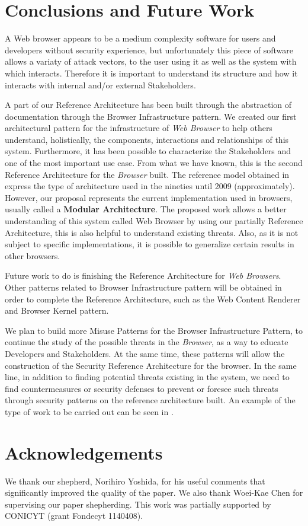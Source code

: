 \documentclass{sig-alternate-05-2015}
\begin{document}
\section{Conclusions and Future Work}
A Web browser appears to be a medium complexity software for users and developers without security experience, but unfortunately this piece of software allows a variaty of attack vectors, to the user using it as well as the system with which interacts. Therefore it is important to understand its structure and how it interacts with internal and/or external Stakeholders.

A part of our Reference Architecture has been built through the abstraction of documentation through the Browser Infrastructure pattern. We created our first architectural pattern for the infrastructure of \textit{Web Browser} to help others understand, holistically, the components, interactions and relationships of this system. Furthermore, it has been possible to characterize the Stakeholders and one of the most important use case. From what we have known, this is the second Reference Architecture for the \textit{Browser} built. The reference model obtained in \cite{2005-grosskurth-browser-refarch} express the type of architecture used in the nineties until 2009 (approximately). However, our proposal represents the current implementation used in browsers, usually called a \textbf{Modular Architecture}. The proposed work allows a better understanding of this system called Web Browser by using our partially Reference Architecture, this is also helpful to understand existing threats. Also, as it is not subject to specific implementations, it is possible to generalize certain results in other browsers. 

Future work to do is finishing the Reference Architecture for \textit{Web Browsers}. Other patterns related to Browser Infrastructure pattern will be obtained in order to complete the Reference Architecture, such as the Web Content Renderer and Browser Kernel pattern. 

We plan to build more Misuse Patterns for the Browser Infrastructure Pattern, to continue the study of the possible threats in the \textit{Browser}, as a way to educate Developers and Stakeholders. At the same time, these patterns will allow the construction of the Security Reference Architecture for the browser. In the same line, in addition to finding potential threats existing in the system, we need to find countermeasures or security defenses to prevent or foresee such threats through security patterns on the reference architecture built. An example of the type of work to be carried out can be seen in \cite{Fernandez2015}.

\section{Acknowledgements}
We thank our shepherd, Norihiro Yoshida, for his useful comments that significantly improved the quality of the paper. We also thank Woei-Kae Chen for supervising our paper shepherding. This work was partially supported by CONICYT (grant Fondecyt 1140408).

  

\end{document}

